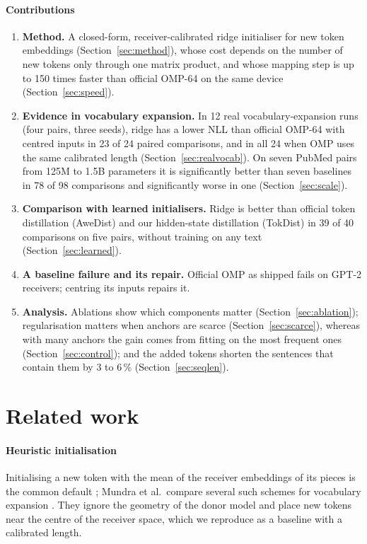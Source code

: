 \documentclass[preprint,12pt]{elsarticle}
\begin{document}
\paragraph{Contributions}
\begin{enumerate}
\item \textbf{Method.} A closed-form, receiver-calibrated ridge initialiser for new token embeddings (Section~\ref{sec:method}), whose cost depends on the number of new tokens only through one matrix product, and whose mapping step is up to 150 times faster than official OMP-64 on the same device (Section~\ref{sec:speed}).
\item \textbf{Evidence in vocabulary expansion.} In 12 real vocabulary-expansion runs (four pairs, three seeds), ridge has a lower NLL than official OMP-64 with centred inputs in 23 of 24 paired comparisons, and in all 24 when OMP uses the same calibrated length (Section~\ref{sec:realvocab}). On seven PubMed pairs from 125M to 1.5B parameters it is significantly better than seven baselines in 78 of 98 comparisons and significantly worse in one (Section~\ref{sec:scale}).
\item \textbf{Comparison with learned initialisers.} Ridge is better than official token distillation (AweDist) and our hidden-state distillation (TokDist) in 39 of 40 comparisons on five pairs, without training on any text (Section~\ref{sec:learned}).
\item \textbf{A baseline failure and its repair.} Official OMP as shipped fails on GPT-2 receivers; centring its inputs repairs it.
\item \textbf{Analysis.} Ablations show which components matter (Section~\ref{sec:ablation}); regularisation matters when anchors are scarce (Section~\ref{sec:scarce}), whereas with many anchors the gain comes from fitting on the most frequent ones (Section~\ref{sec:control}); and the added tokens shorten the sentences that contain them by 3 to 6\,\% (Section~\ref{sec:seqlen}).
\end{enumerate}

\section{Related work}
\label{sec:related}
\paragraph{Heuristic initialisation} Initialising a new token with the mean of the receiver embeddings of its pieces is the common default \cite{gee2022fvt,hewitt2021initializing}; Mundra et al.\ compare several such schemes for vocabulary expansion \cite{mundra2024empirical}. They ignore the geometry of the donor model and place new tokens near the centre of the receiver space, which we reproduce as a baseline with a calibrated length.
\end{document}
